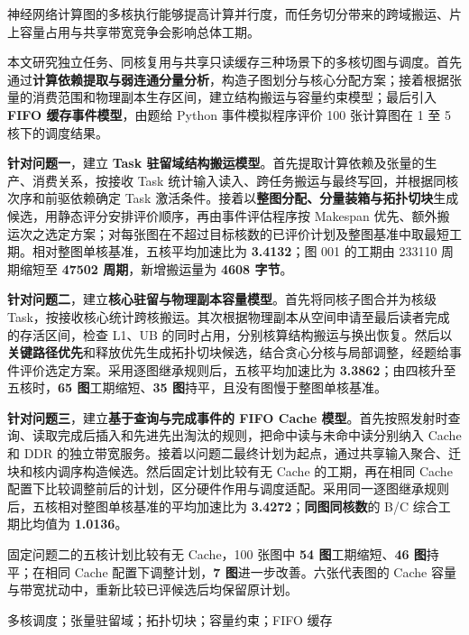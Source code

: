 \noindent\hspace*{2em}神经网络计算图的多核执行能够提高计算并行度，而任务切分带来的跨域搬运、片上容量占用与共享带宽竞争会影响总体工期。

本文研究独立任务、同核复用与共享只读缓存三种场景下的多核切图与调度。首先通过\textbf{计算依赖提取与弱连通分量分析}，构造子图划分与核心分配方案；接着根据张量的消费范围和物理副本生存区间，建立结构搬运与容量约束模型；最后引入 \textbf{FIFO 缓存事件模型}，由题给 Python 事件模拟程序评价 100 张计算图在 1 至 5 核下的调度结果。

\textbf{针对问题一}，建立 \textbf{Task 驻留域结构搬运模型}。首先提取计算依赖及张量的生产、消费关系，按接收 Task 统计输入读入、跨任务搬运与最终写回，并根据同核次序和前驱依赖确定 Task 激活条件。接着以\textbf{整图分配、分量装箱与拓扑切块}生成候选，用静态评分安排评价顺序，再由事件评估程序按 Makespan 优先、额外搬运次之选定方案；对每张图在不超过目标核数的已评价计划及整图基准中取最短工期。相对整图单核基准，五核平均加速比为 \textbf{3.4132}；图 001 的工期由 233110 周期缩短至 \textbf{47502 周期}，新增搬运量为 \textbf{4608 字节}。

\textbf{针对问题二}，建立\textbf{核心驻留与物理副本容量模型}。首先将同核子图合并为核级 Task，按接收核心统计跨核搬运。其次根据物理副本从空间申请至最后读者完成的存活区间，检查 L1、UB 的同时占用，分别核算结构搬运与换出恢复。然后以\textbf{关键路径优先}和释放优先生成拓扑切块候选，结合贪心分核与局部调整，经题给事件评价选定方案。采用逐图继承规则后，五核平均加速比为 \textbf{3.3862}；由四核升至五核时，\textbf{65 图}工期缩短、\textbf{35 图}持平，且没有图慢于整图单核基准。

\textbf{针对问题三}，建立\textbf{基于查询与完成事件的 FIFO Cache 模型}。首先按照发射时查询、读取完成后插入和先进先出淘汰的规则，把命中读与未命中读分别纳入 Cache 和 DDR 的独立带宽服务。接着以问题二最终计划为起点，通过共享输入聚合、迁块和核内调序构造候选。然后固定计划比较有无 Cache 的工期，再在相同 Cache 配置下比较调整前后的计划，区分硬件作用与调度适配。采用同一逐图继承规则后，五核相对整图单核基准的平均加速比为 \textbf{3.4272}；\textbf{同图同核数}的 B/C 综合工期比均值为 \textbf{1.0136}。

固定问题二的五核计划比较有无 Cache，100 张图中 \textbf{54 图}工期缩短、\textbf{46 图}持平；在相同 Cache 配置下调整计划，\textbf{7 图}进一步改善。六张代表图的 Cache 容量与带宽扰动中，重新比较已评候选后均保留原计划。

多核调度；张量驻留域；拓扑切块；容量约束；FIFO 缓存
